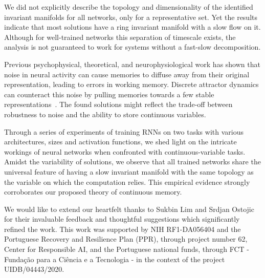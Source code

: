 \documentclass{article} %
\newcounter{ct}
\theoremstyle{definition}
\theoremstyle{remark}
\begin{document}
We did not explicitly describe the topology and dimensionality of the identified invariant manifolds for all networks, only for a representative set.
Yet the results indicate that most solutions have a ring invariant manifold with a slow flow on it.
Although for well-trained networks this separation of timescale exists, the analysis is not guaranteed to work for systems without a fast-slow decomposition.

Previous psychophysical, theoretical, and neurophysiological work has shown that noise in neural activity can cause memories to diffuse away from their original representation, leading to errors in working memory.
Discrete attractor dynamics can counteract this noise by pulling memories towards a few stable representations~\citep{panichello2019,Koulakov2002,Goldman2003-cz}.
The found solutions might reflect the trade-off between robustness to noise and the ability to store continuous variables.


Through a series of experiments of training RNNs on two tasks with various architectures, sizes and activation functions, we shed light on the intricate workings of neural networks when confronted with continuous-variable tasks.
Amidst the variability of solutions, we observe that all trained networks share the universal feature of having a slow invariant manifold with the same topology as the variable on which the computation relies.
This empirical evidence strongly corroborates our proposed theory of continuous memory.




\begin{ack}
We would like to extend our heartfelt thanks to Sukbin Lim and Srdjan Ostojic for their invaluable feedback and thoughtful suggestions which significantly refined the work.
This work was supported by NIH RF1-DA056404 and the Portuguese Recovery and Resilience Plan (PPR), through project number 62, Center for Responsible AI, and the Portuguese national funds, through FCT - Fundação para a Ciência e a Tecnologia - in the context of the project UIDB/04443/2020.
\end{ack}


\end{document}
